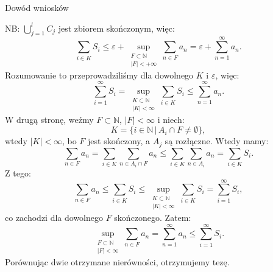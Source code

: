 \documentclass{article}
\numberwithin{defi}{section}
\numberwithin{defi}{section}
\newcommand{\N}{\mathbb{N}}
\newcommand{\oo}{\infty}
\begin{document}
\begin{dow}{Dowód wniosków}
\begin{enumerate}
              NB: $\bigcup_{j=1}^l C_j$ jest zbiorem skończonym, więc:
              \[\sum_{i \in K} S_i \leqslant \varepsilon + \sup_{\substack{F\subset \N \\ |F| <  +\oo}} \sum_{n \in F} a_n = \varepsilon + \sum_{n=1}^{\oo} a_n.\]
              Rozumowanie to przeprowadziliśmy dla dowolnego $K$ i $\varepsilon$, więc:
              \[\sum_{i=1}^{\oo} S_i = \sup_{\substack{K \subset \N \\ |K| < \oo}} \sum_{i \in K} S_i \leqslant \sum_{n=1}^{\oo} a_n.\]
              W drugą stronę, weźmy $F \subset \N$, $|F| < \oo$ i niech:
              \[K = \{ i \in \N \, |\, A_i \cap F \neq \emptyset \},\]
              wtedy $|K| < \oo$, bo $F$ jest skończony, a $A_j$ są rozłączne. Wtedy mamy:
              \[\sum_{n\in F} a_n = \sum_{i\in K} \sum_{n \in A_i \cap F} a_n \leqslant \sum_{i \in K} \sum_{n \in A_i} a_n = \sum_{i \in K} S_i.\]
              Z tego:
              \[\sum_{n \in F} a_n \leqslant \sum_{i \in K} S_i \leqslant \sup_{\substack{K \subset \N \\ |K| < \oo}} \sum_{i \in K} S_i = \sum_{i =1}^{\oo} S_i, \]
              co zachodzi dla dowolnego $F$ skończonego. Zatem:
              \[\sup_{\substack{F \subset \N \\ |F| < \oo}}\sum_{n \in F} a_n = \sum_{n=1}^{\oo}a_n \leqslant \sum_{i =1}^{\oo} S_i.\]
              Porównując dwie otrzymane nierówności, otrzymujemy tezę.
    \end{enumerate}
\end{dow}
\end{document}
